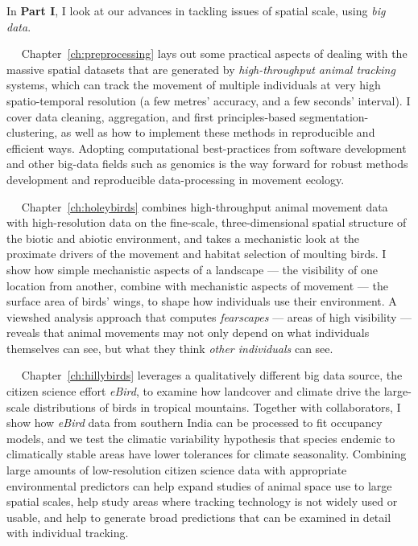 \medskip

\noindent In \textbf{Part I}, I look at our advances in tackling issues of spatial scale, using \textit{big data}.

\adftripleflourishright~~ Chapter~\ref{ch:preprocessing} lays out some practical aspects of dealing with the massive spatial datasets that are generated by \textit{high-throughput animal tracking} systems, which can track the movement of multiple individuals at very high spatio-temporal resolution (a few metres' accuracy, and a few seconds' interval).
I cover data cleaning, aggregation, and first principles-based segmentation-clustering, as well as how to implement these methods in reproducible and efficient ways.
Adopting computational best-practices from software development and other big-data fields such as genomics is the way forward for robust methods development and reproducible data-processing in movement ecology.

\adftripleflourishright~~ Chapter~\ref{ch:holeybirds} combines high-throughput animal movement data with high-resolution data on the fine-scale, three-dimensional spatial structure of the biotic and abiotic environment, and takes a mechanistic look at the proximate drivers of the movement and habitat selection of moulting birds.
I show how simple mechanistic aspects of a landscape --- the visibility of one location from another, combine with mechanistic aspects of movement --- the surface area of birds' wings, to shape how individuals use their environment.
A viewshed analysis approach that computes \textit{fearscapes} --- areas of high visibility --- reveals that animal movements may not only depend on what individuals themselves can see, but what they think \textit{other individuals} can see.

\adftripleflourishright~~ Chapter~\ref{ch:hillybirds} leverages a qualitatively different big data source, the citizen science effort \textit{eBird}, to examine how landcover and climate drive the large-scale distributions of birds in tropical mountains.
Together with collaborators, I show how \textit{eBird} data from southern India can be processed to fit occupancy models, and we test the climatic variability hypothesis that species endemic to climatically stable areas have lower tolerances for climate seasonality.
Combining large amounts of low-resolution citizen science data with appropriate environmental predictors can help expand studies of animal space use to large spatial scales, help study areas where tracking technology is not widely used or usable, and help to generate broad predictions that can be examined in detail with individual tracking.

